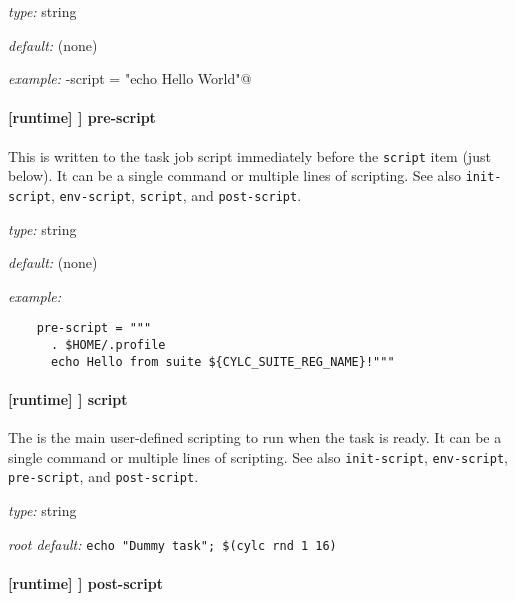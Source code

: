 \begin{myitemize}
\item {\em type:} string
\item {\em default:} (none)
\item {\em example:} \lstinline@env-script = "echo Hello World"@
\end{myitemize}

\paragraph[pre-script]{ [runtime] \textrightarrow [[\_\_NAME\_\_]] \textrightarrow pre-script}

This is written to the task job script immediately before the \lstinline=script=
item (just below). It can be a single command or multiple lines of scripting.
See also \lstinline=init-script=, \lstinline=env-script=, \lstinline=script=, and
\lstinline=post-script=.

\begin{myitemize}
\item {\em type:} string
\item {\em default:} (none)
\item {\em example:}
 \begin{lstlisting}
    pre-script = """
      . $HOME/.profile
      echo Hello from suite ${CYLC_SUITE_REG_NAME}!"""
 \end{lstlisting}
\end{myitemize}

\paragraph[script]{[runtime] \textrightarrow [[\_\_NAME\_\_]] \textrightarrow script}
\label{ScriptItem}

The is the main user-defined scripting to run when the task is ready. It can be a
single command or multiple lines of scripting. See also \lstinline=init-script=,
\lstinline=env-script=, \lstinline=pre-script=, and \lstinline=post-script=.

\begin{myitemize}
\item {\em type:} string
\item {\em root default:} \lstinline=echo "Dummy task"; $(cylc rnd 1 16)=
\end{myitemize}

\paragraph[post-script]{ [runtime] \textrightarrow [[\_\_NAME\_\_]] \textrightarrow post-script}

